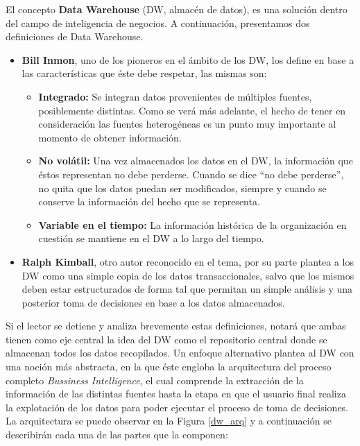 \documentclass[a4paper,11pt]{article}
\begin{document}
    El concepto \textbf{Data Warehouse} (DW, almacén de datos), es una solución dentro del campo de inteligencia de negocios.
    A continuación, presentamos dos definiciones de Data Warehouse.

    \begin{itemize}
      \item \textbf{Bill Inmon}, uno de los pioneros en el ámbito de los DW, los define en base a las características que éste debe respetar, las mismas son:
      \begin{itemize}
        \item \textbf{Integrado:} Se integran datos provenientes de múltiples fuentes, posiblemente distintas. Como se verá más adelante, el hecho de tener
        en consideración las fuentes heterogéneas es un punto muy importante al momento de obtener información.
        \item \textbf{No volátil:} Una vez almacenados los datos en el DW, la información que éstos representan no debe perderse. Cuando se dice
        ``no debe perderse'', no quita que los datos puedan ser modificados, siempre y cuando se conserve la información del hecho que se representa.
        \item \textbf{Variable en el tiempo:} La información histórica de la organización en cuestión se mantiene en el DW a lo largo del tiempo.
      \end{itemize}
      \item \textbf{Ralph Kimball}, otro autor reconocido en el tema, por su parte plantea a los DW como una simple copia de los datos transaccionales,
      salvo que los mismos deben estar estructurados de forma tal que permitan un simple análisis y una posterior toma de decisiones en base a los
      datos almacenados.
    \end{itemize}
    
    Si el lector se detiene y analiza brevemente estas definiciones, notará que ambas tienen como eje central la idea del DW como el repositorio central
    donde se almacenan todos los datos recopilados. Un enfoque alternativo plantea al DW con una noción más abstracta, en la que éste engloba
    la arquitectura del proceso completo \textit{Bussiness Intelligence}, el cual comprende la
    extracción de la información de las distintas fuentes hasta la etapa en que el usuario final realiza la explotación de los datos para poder ejecutar el
    proceso de toma de decisiones. La arquitectura se puede observar en la Figura \ref{dw_arq} y a continuación se describirán cada
    una de las partes que la componen:
\end{document}
